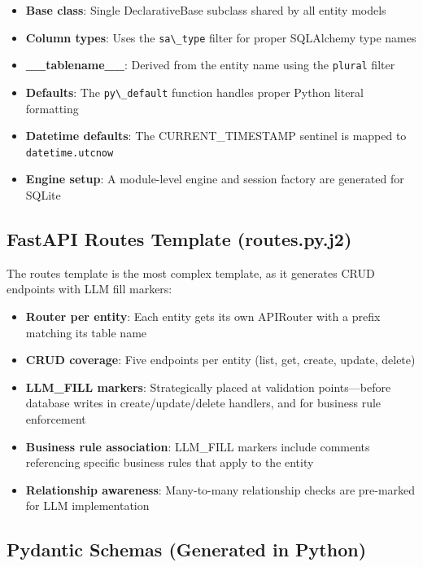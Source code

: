 \documentclass[11pt,a4paper]{article}
\begin{document}
{\begin{itemize}
    \item \textbf{Base class}: Single DeclarativeBase subclass shared by all entity models
    \item \textbf{Column types}: Uses the {\lstinline|sa\_type|} filter for proper SQLAlchemy type names
    \item \textbf{\_\_tablename\_\_}: Derived from the entity name using the {\lstinline|plural|} filter
    \item \textbf{Defaults}: The {\lstinline|py\_default|} function handles proper Python literal formatting
    \item \textbf{Datetime defaults}: The CURRENT\_TIMESTAMP sentinel is mapped to {\lstinline|datetime.utcnow|}
    \item \textbf{Engine setup}: A module-level engine and session factory are generated for SQLite
\end{itemize}

\subsection{FastAPI Routes Template (routes.py.j2)}

The routes template is the most complex template, as it generates CRUD endpoints with LLM fill markers:

\begin{itemize}
    \item \textbf{Router per entity}: Each entity gets its own APIRouter with a prefix matching its table name
    \item \textbf{CRUD coverage}: Five endpoints per entity (list, get, create, update, delete)
    \item \textbf{LLM\_FILL markers}: Strategically placed at validation points---before database writes in create/update/delete handlers, and for business rule enforcement
    \item \textbf{Business rule association}: LLM\_FILL markers include comments referencing specific business rules that apply to the entity
    \item \textbf{Relationship awareness}: Many-to-many relationship checks are pre-marked for LLM implementation
\end{itemize}

\subsection{Pydantic Schemas (Generated in Python)}

}
\end{document}
